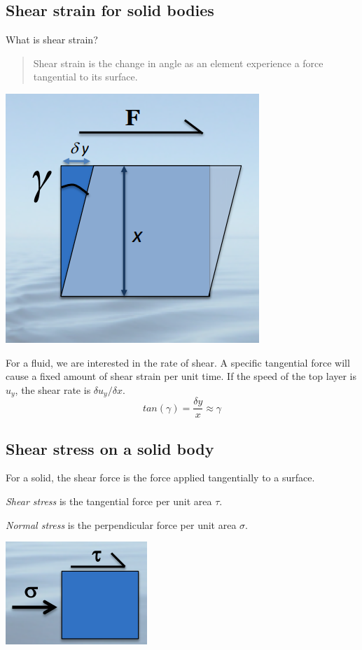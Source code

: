 \documentclass[class=report, crop=false, 12pt,a4paper]{standalone}
\begin{document}
\subsection{Shear strain for solid bodies}
What is shear strain?
\begin{quote}
  \begin{center}
    Shear strain is the change in angle as an element experience a force tangential to its surface.
  \end{center}
\end{quote}
\begin{center}
  \includegraphics[width = 0.4 \textwidth]{../img/ShearStrainDiagram}
\end{center}
For a fluid, we are interested in the rate of shear. A specific tangential force will cause a fixed amount of shear strain per unit time. If the speed of the top layer is \( u_y\), the shear rate is \(\delta u_y / \delta x\).
\begin{equation}
  tan(\gamma) = \frac{\delta y}{x} \approx \gamma
\end{equation}

\subsection{Shear stress on a solid body}
For a solid, the shear force is the force applied tangentially to a surface.

\emph{Shear stress} is the tangential force per unit area \( \tau\).

\emph{Normal stress} is the perpendicular force per unit area \( \sigma \).

\begin{center}
  \includegraphics[width = 0.4 \textwidth]{../img/ShearForceDiagram}
\end{center}
\end{document}
